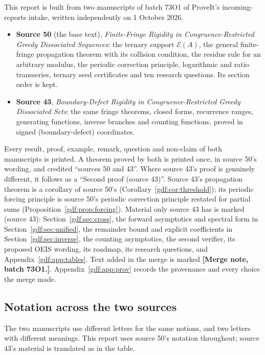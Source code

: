 \documentclass[11pt,a4paper]{article}
\numberwithin{equation}{section}
\theoremstyle{definition}
\theoremstyle{remark}
\theoremstyle{plain}
\newcommand{\cE}{\mathcal E}
\newcommand{\src}[1]{\textup{(source #1)}}
\begin{document}
This report is built from two manuscripts of batch 73O1 of ProveIt's
incoming-reports intake, written independently on 1 October 2026.
\begin{itemize}
\item \textbf{Source 50} (the base text), \emph{Finite-Fringe Rigidity in
  Congruence-Restricted Greedy Dissociated Sequences}: the ternary support
  $\cE(A)$, the general finite-fringe propagation theorem with its collision
  condition, the residue rule for an arbitrary modulus, the periodic
  correction principle, logarithmic and ratio transseries, ternary seed
  certificates and ten research questions.  Its section order is kept.
\item \textbf{Source 43}, \emph{Boundary-Defect Rigidity in
  Congruence-Restricted Greedy Dissociated Sets}: the same fringe theorems,
  closed forms, recurrence ranges, generating functions, inverse branches and
  counting functions, proved in signed (boundary-defect) coordinates.
\end{itemize}
Every result, proof, example, remark, question and non-claim of both
manuscripts is printed.  A theorem proved by both is printed once, in source
50's wording, and credited ``sources 50 and 43''.  Where source 43's proof is
genuinely different, it follows as a ``Second proof (source 43)''.  Source
43's propagation theorem is a corollary of source 50's
(Corollary~\ref{gdf:cor:threshold}); its periodic forcing principle is
source 50's periodic correction principle restated for partial sums
(Proposition~\ref{gdf:prop:forcing}).  Material only source 43 has is marked
\src{43}: Section~\ref{gdf:sec:cross}, the forward asymptotics and spectral
form in Section~\ref{gdf:sec:unified}, the remainder bound and explicit
coefficients in Section~\ref{gdf:sec:inverse}, the counting asymptotics, the
second verifier, its proposed OEIS wording, its roadmap, its research
questions, and Appendix~\ref{gdf:app:tables}.  Text added in the merge is
marked \textbf{[Merge note, batch 73O1.]}.  Appendix~\ref{gdf:app:prov}
records the provenance and every choice the merge made.

\subsection{Notation across the two sources}\label{gdf:sec:notation}

The two manuscripts use different letters for the same notions, and two
letters with different meanings.  This report uses source 50's notation
throughout; source 43's material is translated as in the table.
\end{document}

